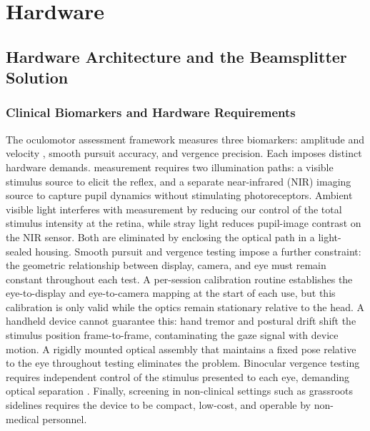 \chapter{Hardware}
\label{chapter:headset}

\section{Hardware Architecture and the Beamsplitter Solution}
\label{sec:hw-architecture}


\subsection{Clinical Biomarkers and Hardware Requirements}
\label{sec:hw-biomarkers-requirements}

The oculomotor assessment framework measures three biomarkers:  amplitude and velocity \todo, smooth pursuit accuracy, and vergence precision. Each imposes distinct hardware demands.  measurement requires two illumination paths: a visible stimulus source to elicit the reflex, and a separate near-infrared (NIR) imaging source to capture pupil dynamics without stimulating photoreceptors. Ambient visible light interferes with  measurement by reducing our control of the total stimulus intensity at the retina, while stray light reduces pupil-image contrast on the NIR sensor. Both are eliminated by enclosing the optical path in a light-sealed housing. Smooth pursuit and vergence testing impose a further constraint: the geometric relationship between display, camera, and eye must remain constant throughout each test. A per-session calibration routine establishes the eye-to-display and eye-to-camera mapping at the start of each use, but this calibration is only valid while the optics remain stationary relative to the head. A handheld device cannot guarantee this: hand tremor and postural drift shift the stimulus position frame-to-frame, contaminating the gaze signal with device motion. A rigidly mounted optical assembly that maintains a fixed pose relative to the eye throughout testing eliminates the problem. Binocular vergence testing requires independent control of the stimulus presented to each eye, demanding optical separation \todo. Finally, screening in non-clinical settings such as grassroots sidelines requires the device to be compact, \todo low-cost, and operable by non-medical personnel.

